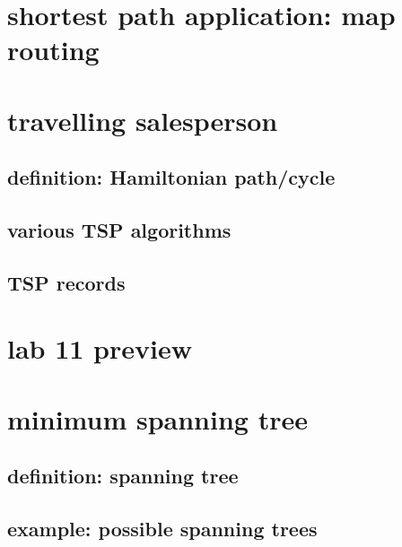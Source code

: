 \section{shortest path application: map routing} %



\section{travelling salesperson}





\subsection{definition: Hamiltonian path/cycle}



\subsection{various TSP algorithms}



\subsection{TSP records}



\section{lab 11 preview}



\section{minimum spanning tree}

\subsection{definition: spanning tree}



\subsection{example: possible spanning trees}

